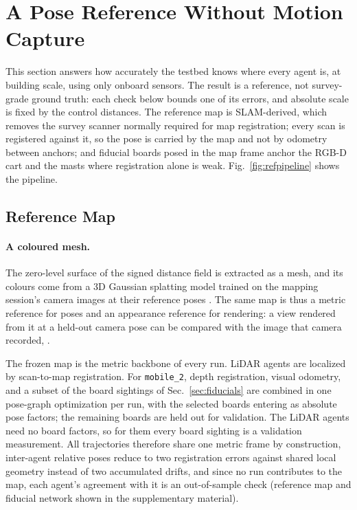 \section{A Pose Reference Without Motion Capture}
\label{sec:gt}
This section answers how accurately the testbed knows where every
agent is, at building scale, using only onboard sensors. The result is a
reference, not survey-grade ground truth: each check below bounds one
of its errors, and absolute scale is fixed by the control distances. The reference
map is SLAM-derived, which removes the survey scanner normally required
for map registration; every scan is registered against it, so the pose
is carried by the map and not by odometry between anchors; and
fiducial boards posed in the map frame anchor the RGB-D cart and the
masts where registration alone is weak. Fig.~\ref{fig:refpipeline}
shows the pipeline.



\subsection{Reference Map}
\label{sec:map}


\paragraph{A coloured mesh.} The zero-level surface of the signed
distance field is extracted as a mesh, and its colours come from a 3D
Gaussian splatting model \cite{kerbl2023gaussian} trained on the
mapping session's camera images at their reference poses
. The same map is thus a metric reference for poses
and an appearance reference for rendering: a view rendered from it at a
held-out camera pose can be compared with the image that camera
recorded, .

The frozen map is the metric backbone of every run. LiDAR agents are
localized by scan-to-map registration. For \texttt{mobile\_2}, depth
registration, visual odometry, and a subset of the board sightings of
Sec.~\ref{sec:fiducials} are combined in one pose-graph optimization
per run, with the selected boards entering as absolute pose factors;
the remaining boards are held out for validation. The LiDAR agents
need no board factors, so for them every board sighting is a
validation measurement. All trajectories therefore share one metric
frame by construction, inter-agent relative poses reduce to two
registration errors against shared local geometry instead of two
accumulated drifts, and since no run contributes to the map, each
agent's agreement with it is an out-of-sample check (reference map and
fiducial network shown in the supplementary material).

